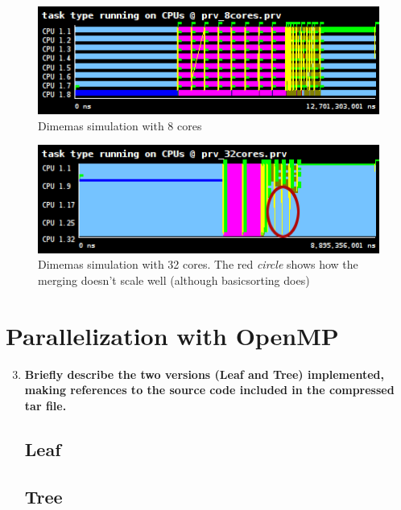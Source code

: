 \documentclass[a4paper,11pt]{article}
\begin{document}
\begin{enumerate}
\vspace{0.5cm}
\begin{figure}[h!]
  \center
  \includegraphics[width=1.0\textwidth]{figs/paraver_8_cores.png}
  \caption{Dimemas simulation with 8 cores}
\end{figure}

\vspace{0.5cm}
\begin{figure}[h!]
  \center
  \includegraphics[width=1.0\textwidth]{figs/paraver_32_cores.png}
  \caption{Dimemas simulation with 32 cores. The red \emph{circle} shows how the
    merging doesn't scale well (although basicsorting does)}
\end{figure}

\end{enumerate}

\newpage
\section{Parallelization with OpenMP}
\begin{enumerate}
  \setcounter{enumi}{2}
  \item
    \textbf{Briefly describe the two versions (Leaf and Tree)
      implemented, making references to the source code included in
      the compressed tar file.}

\subsection*{Leaf}

\subsection*{Tree}

\end{enumerate}
\end{document}
